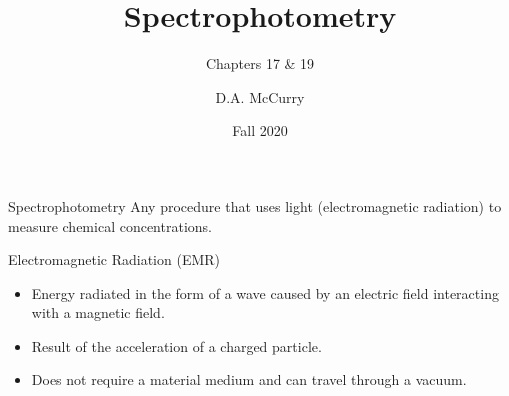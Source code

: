 \documentclass[notes=only]{beamer}
\title{Spectrophotometry}
\subtitle{Chapters 17 \& 19}
\institute{CHEM321 --- Analytical Chemistry I \\ Bloomsburg University}
\author{D.A. McCurry}
\date{Fall 2020}
\begin{document}
\maketitle
{}



\begin{frame}{Spectrophotometry}
	Any procedure that uses light (electromagnetic radiation) to measure
	chemical concentrations.

	\bigskip

	\begin{block}{Electromagnetic Radiation (EMR)}
		\begin{itemize}
			\item Energy radiated in the form of a \alert{wave}
				caused by an electric field interacting with a
				magnetic field.
			\item Result of the acceleration of a charged particle.
			\item Does not require a material medium and can travel
				through a vacuum.
		\end{itemize}
	\end{block}
\end{frame}
\end{document}
